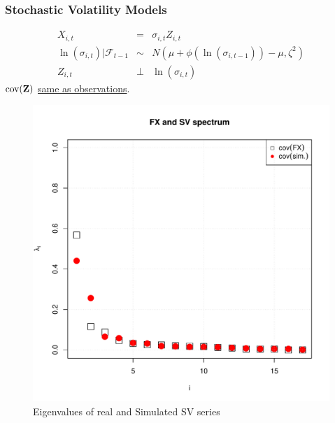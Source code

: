 \documentclass{beamer}
\begin{document}
\begin{frame}
  \frametitle{Stochastic Volatility Models}
  \begin{minipage}{0.6\linewidth}
    \begin{scriptsize}
      \begin{eqnarray*}
        X_{i, t} &=& \sigma_{i, t} Z_{i,t} \\
        \ln(\sigma_{i,t})|\mathcal F_{t-1} &\sim& N(\mu + \phi(\ln(\sigma_{i,t-1})) - \mu, \zeta^2)\\
        Z_{i, t} &\bot& \ln(\sigma_{i,t})
      \end{eqnarray*}
      $\text{cov}(\mathbf{Z})$ \underline{same as observations}.
    \end{scriptsize}
  \end{minipage}\hfill
  \begin{minipage}{0.4\linewidth}
    \begin{figure}[htb!]
      \centering
      \includegraphics[width=1.0\linewidth]{FX_sv_eigenvalues.pdf}
      \caption{\scriptsize Eigenvalues of real and Simulated SV series}
    \end{figure}
  \end{minipage}
\end{frame}
\end{document}
